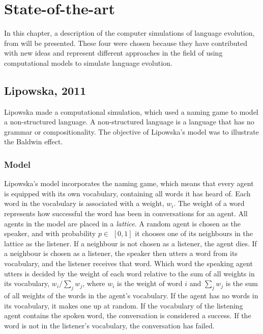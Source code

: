 \acresetall
\chapter{State-of-the-art}\label{ch:LitteratureStudy}

In this chapter, a description of the computer simulations of language evolution, from \citet{lipowska2011naming, gong2004computational, munroe2002learning, lekvam2014co} will be presented. These four were chosen because they have contributed with new ideas and represent different approaches in the field of using computational models to simulate language evolution.   

\section{Lipowska, 2011}\label{sec:Lipowska}
Lipowska made a computational simulation, which used a naming game to model a non-structured language. A non-structured language is a language that has no grammar or compositionality. The objective of Lipowska's model was to illustrate the Baldwin effect. 

\subsection{Model}
Lipowska's model incorporates the naming game, which means that every agent is equipped with its own vocabulary, containing all words it has heard of. Each word in the vocabulary is associated with a weight, $w_{i}$. The weight of a word represents how successful the word has been in conversations for an agent. All agents in the model are placed in a \textit{lattice}. A random agent is chosen as the speaker, and with probability $p\in$ $[0, 1]$ it chooses one of its neighbours in the lattice as the listener. If a neighbour is not chosen as a listener, the agent dies. If a neighbour is chosen as a listener, the speaker then utters a word from its vocabulary, and the listener receives that word. Which word the speaking agent utters is decided by the weight of each word relative to the sum of all weights in its vocabulary, $w_{i} / \sum_{j} w_{j}$, where $w_i$ is the weight of word $i$ and $\sum_{j} w_{j}$ is the sum of all weights of the words in the agent's vocabulary. If the agent has no words in its vocabulary, it makes one up at random. If the vocabulary of the listening agent contains the spoken word, the conversation is considered a success. If the word is not in the listener's vocabulary, the conversation has failed. 

